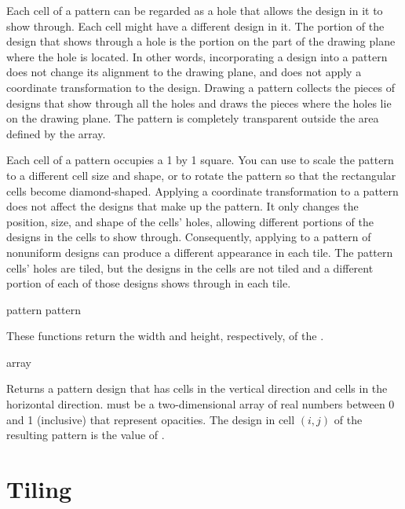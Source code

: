 Each cell of a pattern can be regarded as a hole that allows the design in it to
show through.  Each cell might have a different design in it.  The portion of
the design that shows through a hole is the portion on the part of the drawing
plane where the hole is located.  In other words, incorporating a design into a
pattern does not change its alignment to the drawing plane, and does not apply a
coordinate transformation to the design.  Drawing a pattern collects the pieces
of designs that show through all the holes and draws the pieces where the holes
lie on the drawing plane.  The pattern is completely transparent outside the
area defined by the array.

Each cell of a pattern occupies a 1 by 1 square.  You can use
 to scale the pattern to a different cell size and shape,
or to rotate the pattern so that the rectangular cells become diamond-shaped.
Applying a coordinate transformation to a pattern does not affect the designs
that make up the pattern.  It only changes the position, size, and shape of the
cells' holes, allowing different portions of the designs in the cells to show
through.  Consequently, applying  to a pattern of
nonuniform designs can produce a different appearance in each tile.  The pattern
cells' holes are tiled, but the designs in the cells are not tiled and a
different portion of each of those designs shows through in each tile.

\MayCaptureInputs

 {pattern}
 {pattern}

These functions return the width and height, respectively, of the 
.


 {array}

Returns a pattern design that has  cells in
the vertical direction and  cells in the
horizontal direction.   must be a two-dimensional array of real
numbers between 0 and 1 (inclusive) that represent opacities.  The design in
cell $(i,j)$ of the resulting pattern is the value of .

\MayCaptureInputs


\section {Tiling}

